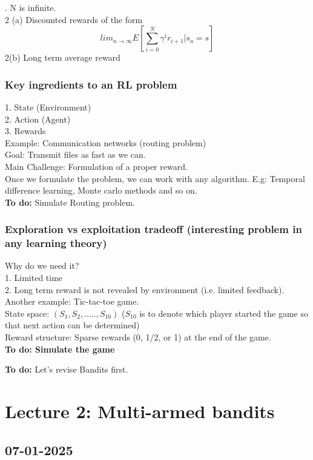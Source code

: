 \documentclass{book}
\begin{document}
. N is infinite.\\
2 (a) Discounted rewards of the form
$$
lim_{n \rightarrow \infty} E[\sum_{i = 0}^{N} \gamma^{i} r_{i+1}| s_{a} = s]
$$
2(b) Long term average reward\\

\subsection{Key ingredients to an RL problem}
1. State (Environment)\\
2. Action (Agent)\\
3. Rewards\\

\noindent Example: Communication networks (routing problem)\\
Goal: Transmit files as fast as we can.\\
Main Challenge: Formulation of a proper reward.\\
Once we formulate the problem, we can work with any algorithm. E.g: Temporal difference learning, Monte carlo methods and so on.\\
\textbf{To do:} Simulate Routing problem.

\subsection{Exploration vs exploitation tradeoff (interesting problem in any learning theory)}
Why do we need it? \\
1. Limited time\\
2. Long term reward is not revealed by environment (i.e. limited feedback).\\

Another example: Tic-tac-toe game.\\
State space: $(S_{1}, S_{2}, ....., S_{10})$
($S_{10}$  is to denote which player started the game so that next action can be determined)\\
Reward structure: Sparse rewards (0, 1/2, or 1) at the end of the game.\\
\textbf{To do: Simulate the game}

\textbf{To do:} Let's revise Bandits first.

\chapter{Lecture 2: Multi-armed bandits}
\section{07-01-2025}
\end{document}
